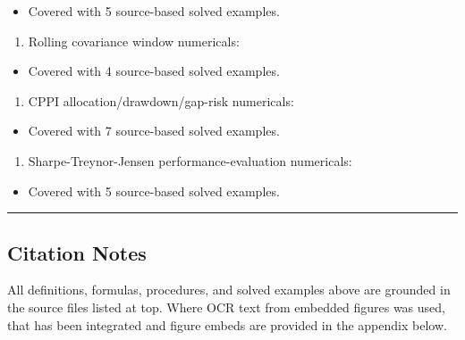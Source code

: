 \documentclass[
]{article}
\providecommand{\tightlist}{%
  \setlength{\itemsep}{0pt}\setlength{\parskip}{0pt}}
\begin{document}
\begin{itemize}
\tightlist
\item
  Covered with 5 source-based solved examples.
\end{itemize}

\begin{enumerate}
\def\labelenumi{\arabic{enumi}.}
\setcounter{enumi}{6}
\tightlist
\item
  Rolling covariance window numericals:
\end{enumerate}

\begin{itemize}
\tightlist
\item
  Covered with 4 source-based solved examples.
\end{itemize}

\begin{enumerate}
\def\labelenumi{\arabic{enumi}.}
\setcounter{enumi}{7}
\tightlist
\item
  CPPI allocation/drawdown/gap-risk numericals:
\end{enumerate}

\begin{itemize}
\tightlist
\item
  Covered with 7 source-based solved examples.
\end{itemize}

\begin{enumerate}
\def\labelenumi{\arabic{enumi}.}
\setcounter{enumi}{8}
\tightlist
\item
  Sharpe-Treynor-Jensen performance-evaluation numericals:
\end{enumerate}

\begin{itemize}
\tightlist
\item
  Covered with 5 source-based solved examples.
\end{itemize}

\begin{center}\rule{0.5\linewidth}{0.5pt}\end{center}

\hypertarget{citation-notes}{%
\subsection{Citation Notes}\label{citation-notes}}

All definitions, formulas, procedures, and solved examples above are
grounded in the source files listed at top. Where OCR text from embedded
figures was used, that has been integrated and figure embeds are
provided in the appendix below.
\end{document}
